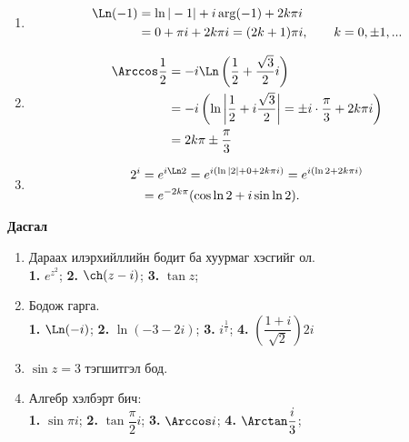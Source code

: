 \begin{sol}
\begin{enumerate}
    \item \begin{align*}
    \Ln(-1)&=\ln|-1|+i \arg  (-1)+2 k\pi i \\
    &= 0+\pi i +2 k \pi i= (2k+1)\pi i, \qquad k=0,\pm 1, ...
\end{align*}
\item 
\begin{align*}
    \Arccos\dfrac{1}{2}&= -i \Ln \left(\dfrac{1}{2}+\dfrac{\sqrt{3}}{2}i\right) \\
    &=-i \left(\ln\left|\dfrac{1}{2}+i\dfrac{\sqrt{3}}{2}\right|=\pm i\cdot \dfrac{\pi}{3}+2k\pi i\right)  \\
    &=2 k\pi \pm \dfrac{\pi}{3}
\end{align*}
\item 
\begin{align*}
    2^i&=e^{i \Ln 2} =e^{i(\ln|2|+0+2k\pi i)}=e^{i(\ln2+2k\pi i)}\\
    &=e^{-2k \pi} (\cos \ln 2+ i\sin \ln 2).
\end{align*}
\end{enumerate}
\end{sol}
\newpage
\begin{center}
    \textbf{Дасгал}
\end{center}
\begin{enumerate}
    \item [11.] Дараах илэрхийллийн бодит ба хуурмаг хэсгийг ол. \\
   \textbf{ 1.} $e^{z^2}$; \qquad \textbf{2. }$\ch (z-i)$; \qquad \textbf{3.} $\tan z$;
   \item [12.] Бодож гарга. \\
    \textbf{ 1.} $\Ln (-i)$; \qquad \textbf{2. }$\ln(-3-2i)$; \qquad \textbf{3.} $i^{\frac{1}{i}}$; \qquad \textbf{4.} $\left ( \dfrac{1+i}{\sqrt{2}}\right)2i$
    \item [13.] $\sin z=3$ тэгшитгэл бод.
    \item [14.] Алгебр хэлбэрт бич:\\
    \textbf{ 1.} $\sin \pi i$; \qquad \textbf{2. }$ \tan \dfrac{\pi}{2}i$; \qquad \textbf{3.} $\Arccos i$; \qquad \textbf{4.} $\Arctan \dfrac{i}{3}$;
\end{enumerate}
